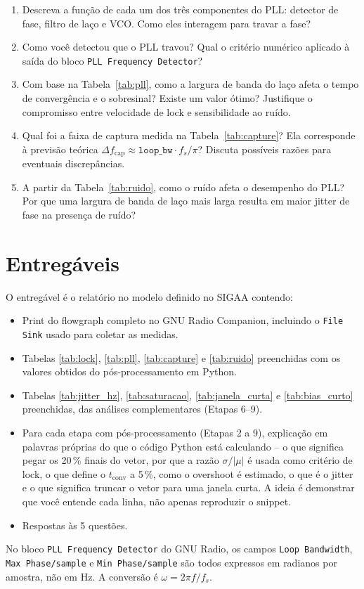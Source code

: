 \documentclass[11pt,a4paper]{article}
\begin{document}
\begin{enumerate}[label=\textbf{Q\arabic*.}, leftmargin=*]

  \item Descreva a função de cada um dos três componentes do PLL:
    detector de fase, filtro de laço e VCO. Como eles interagem para
    travar a fase?

  \item Como você detectou que o PLL travou? Qual o critério numérico
    aplicado à saída do bloco \texttt{PLL Frequency Detector}?

  \item Com base na Tabela~\ref{tab:pll}, como a largura de banda do laço
    afeta o tempo de convergência e o sobresinal? Existe um valor ótimo?
    Justifique o compromisso entre velocidade de lock e sensibilidade ao
    ruído.

  \item Qual foi a faixa de captura medida na Tabela~\ref{tab:capture}?
    Ela corresponde à previsão teórica $\Delta f_\text{cap} \approx
    \texttt{loop\_bw}\cdot f_s/\pi$? Discuta possíveis razões para
    eventuais discrepâncias.

  \item A partir da Tabela~\ref{tab:ruido}, como o ruído afeta o
    desempenho do PLL? Por que uma largura de banda de laço mais larga
    resulta em maior jitter de fase na presença de ruído?

\end{enumerate}

\section{Entregáveis}

O entregável é o relatório no modelo definido no SIGAA contendo:

\begin{itemize}
  \item Print do flowgraph completo no GNU Radio Companion, incluindo o
    \texttt{File Sink} usado para coletar as medidas.
  \item Tabelas \ref{tab:lock}, \ref{tab:pll}, \ref{tab:capture} e
    \ref{tab:ruido} preenchidas com os valores obtidos do pós-processamento
    em Python.
  \item Tabelas \ref{tab:jitter_hz}, \ref{tab:saturacao},
    \ref{tab:janela_curta} e \ref{tab:bias_curto} preenchidas, das análises
    complementares (Etapas 6--9).
  \item Para cada etapa com pós-processamento (Etapas 2 a 9), explicação em
    palavras próprias do que o código Python está calculando -- o que
    significa pegar os 20\,\% finais do vetor, por que a razão
    $\sigma/|\mu|$ é usada como critério de lock, o que define o
    $t_\text{conv}$ a 5\,\%, como o overshoot é estimado, o que é o jitter
    e o que significa truncar o vetor para uma janela curta. A ideia é
    demonstrar que você entende cada linha, não apenas reproduzir o snippet.
  \item Respostas às 5 questões.
\end{itemize}

\begin{atencao}
No bloco \texttt{PLL Frequency Detector} do GNU Radio, os campos
\texttt{Loop Bandwidth}, \texttt{Max Phase/sample} e
\texttt{Min Phase/sample} são todos expressos em radianos por amostra,
não em Hz. A conversão é $\omega = 2\pi f / f_s$.
\end{atencao}
\end{document}
